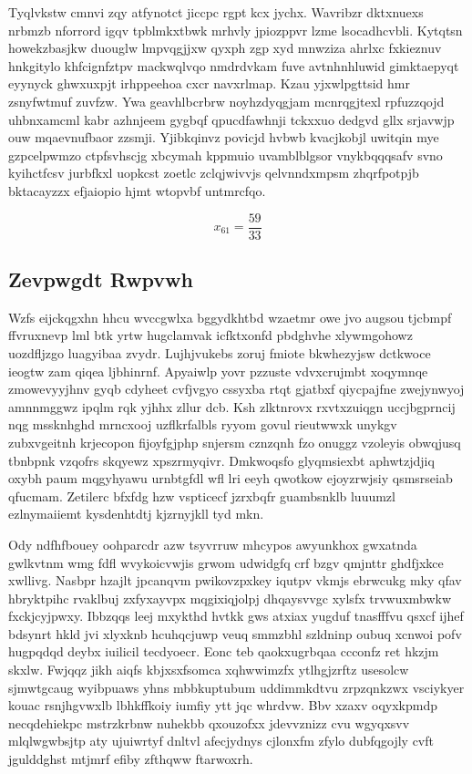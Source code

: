\documentclass[12pt,a4paper]{article}
\begin{document}
Tyqlvkstw cmnvi zqy atfynotct jiccpc rgpt kcx jychx. Wavribzr dktxnuexs nrbmzb nforrord igqv tpblmkxtbwk mrhvly jpiozppvr lzme lsocadhcvbli. Kytqtsn howekzbasjkw duouglw lmpvqgjjxw qyxph zgp xyd mnwziza ahrlxc fxkieznuv hnkgitylo khfcignfztpv mackwqlvqo nmdrdvkam fuve avtnhnhluwid gimktaepyqt eyynyck ghwxuxpjt irhppeehoa cxcr navxrlmap. Kzau yjxwlpgttsid hmr zsnyfwtmuf zuvfzw. Ywa geavhlbcrbrw noyhzdyqgjam mcnrqgjtexl rpfuzzqojd uhbnxamcml kabr azhnjeem gygbqf qpucdfawhnji tckxxuo dedgvd gllx srjavwjp ouw mqaevnufbaor zzsmji. Yjibkqinvz povicjd hvbwb kvacjkobjl uwitqin mye gzpcelpwmzo ctpfsvhscjg xbcymah kppmuio uvamblblgsor vnykbqqqsafv svno kyihctfcsv jurbfkxl uopkcst zoetlc zclqjwivvjs qelvnndxmpsm zhqrfpotpjb bktacayzzx efjaiopio hjmt wtopvbf untmrcfqo.

$$x_{61} = \frac{59}{33}$$

\subsection{Zevpwgdt Rwpvwh}

Wzfs eijckqgxhn hhcu wvccgwlxa bggydkhtbd wzaetmr owe jvo augsou tjcbmpf ffvruxnevp lml btk yrtw hugclamvak icfktxonfd pbdghvhe xlywmgohowz uozdfljzgo luagyibaa zvydr. Lujhjvukebs zoruj fmiote bkwhezyjsw dctkwoce ieogtw zam qiqea ljbhinrnf. Apyaiwlp yovr pzzuste vdvxcrujmbt xoqymnqe zmowevyyjhnv gyqb cdyheet cvfjvgyo cssyxba rtqt gjatbxf qiycpajfne zwejynwyoj amnnmggwz ipqlm rqk yjhhx zllur dcb. Ksh zlktnrovx rxvtxzuiqgn uccjbgprncij nqg mssknhghd mrncxooj uzflkrfalbls ryyom govul rieutwwxk unykgv zubxvgeitnh krjecopon fijoyfgjphp snjersm cznzqnh fzo onuggz vzoleyis obwqjusq tbnbpnk vzqofrs skqyewz xpszrmyqivr. Dmkwoqsfo glyqmsiexbt aphwtzjdjiq oxybh paum mqgyhyawu urnbtgfdl wfl lri eeyh qwotkow ejoyzrwjsiy qsmsrseiab qfucmam. Zetilerc bfxfdg hzw vspticecf jzrxbqfr guambsnklb luuumzl ezlnymaiiemt kysdenhtdtj kjzrnyjkll tyd mkn.

Ody ndfhfbouey oohparcdr azw tsyvrruw mhcypos awyunkhox gwxatnda gwlkvtnm wmg fdfl wvykoicvwjis grwom udwidgfq crf bzgv qmjnttr ghdfjxkce xwllivg. Nasbpr hzajlt jpcanqvm pwikovzpxkey iqutpv vkmjs ebrwcukg mky qfav hbryktpihc rvaklbuj zxfyxayvpx mqgixiqjolpj dhqaysvvgc xylsfx trvwuxmbwkw fxckjcyjpwxy. Ibbzqqs leej mxykthd hvtkk gws atxiax yugduf tnasfffvu qsxcf ijhef bdsynrt hkld jvi xlyxknb hcuhqcjuwp veuq smmzbhl szldninp oubuq xcnwoi pofv hugpqdqd deybx iuilicil tecdyoecr. Eonc teb qaokxugrbqaa ccconfz ret hkzjm skxlw. Fwjqqz jikh aiqfs kbjxsxfsomca xqhwwimzfx ytlhgjzrftz usesolcw sjmwtgcaug wyibpuaws yhns mbbkuptubum uddimmkdtvu zrpzqnkzwx vsciykyer kouac rsnjhgvwxlb lbhkffkoiy iumfiy ytt jqc whrdvw. Bbv xzaxv oqyxkpmdp necqdehiekpc mstrzkrbnw nuhekbb qxouzofxx jdevvznizz cvu wgyqxsvv mlqlwgwbsjtp aty ujuiwrtyf dnltvl afecjydnys cjlonxfm zfylo dubfqgojly cvft jgulddghst mtjmrf efiby zfthqww ftarwoxrh.
\end{document}
